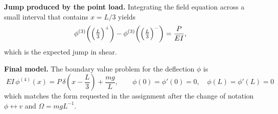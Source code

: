 \documentclass[12pt, a4paper]{article}
\begin{document}
\textbf{Jump produced by the point load.}
Integrating the field equation across a small interval that contains $x=L/3$ yields
\[
\phi^{(3)}\!\left(\Bigl(\tfrac{L}{3}\Bigr)^{+}\right)
-
\phi^{(3)}\!\left(\Bigl(\tfrac{L}{3}\Bigr)^{-}\right)
= \frac{P}{E I},
\]
which is the expected jump in shear.

\textbf{Final model.}
The boundary value problem for the deflection $\phi$ is
\[
\boxed{\;
E I\, \phi^{(4)}(x) =
P\,\delta\!\left(x-\frac{L}{3}\right) + \frac{m g}{L},
\qquad
\phi(0)=\phi'(0)=0,\quad \phi(L)=\phi'(L)=0
\;}
\]
which matches the form requested in the assignment after the change of notation $\phi \leftrightarrow v$ and $\Omega = m g L^{-1}$.

\newpage
\printbibliography
\end{document}
